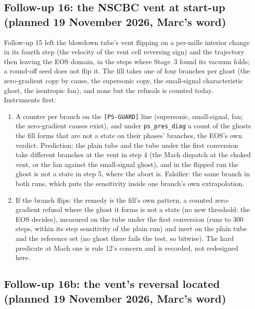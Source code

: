 \documentclass[11pt,a4paper]{article}
\newcommand{\code}[1]{\texttt{\small #1}}
\begin{document}
\subsection*{Follow-up 16: the NSCBC vent at start-up (planned 19 November 2026, Marc's word)}

Follow-up 15 left the blowdown tube's vent flipping on a per-mille
interior change in its fourth step (the velocity of the vent cell
reversing sign) and the trajectory then leaving the EOS domain, in the
steps where Stage~3 found its vacuum folds; a round-off seed does not
flip it.  The fill takes one of four branches per ghost (the
zero-gradient copy by cause, the supersonic copy, the small-signal
characteristic ghost, the isentropic fan), and none but the refusals is
counted today.  Instruments first:
\begin{enumerate}[nosep]
\item A counter per branch on the \code{[PS-GUARD]} line (supersonic,
      small-signal, fan; the zero-gradient causes exist), and under
      \code{ps\_pres\_diag} a count of the ghosts the fill forms that are
      not a state on their phases' branches, the EOS's own verdict.
      Prediction: the plain tube and the tube under the first conversion
      take different branches at the vent in step 4 (the Mach dispatch
      at the choked vent, or the fan against the small-signal ghost),
      and in the flipped run the ghost is not a state in step 5, where
      the abort is.  Falsifier: the same branch in both runs, which puts
      the sensitivity inside one branch's own extrapolation.
\item If the branch flips: the remedy is the fill's own pattern, a
      counted zero-gradient refusal where the ghost it forms is not a
      state (no new threshold: the EOS decides), measured on the tube
      under the first conversion (runs to 300 steps, within its step
      sensitivity of the plain run) and inert on the plain tube and the
      reference set (no ghost there fails the test, so bitwise).  The
      hard predicate at Mach one is rule 12's concern and is recorded,
      not redesigned here.
\end{enumerate}

\subsection*{Follow-up 16b: the vent's reversal located (planned 19 November 2026, Marc's word)}
\end{document}
